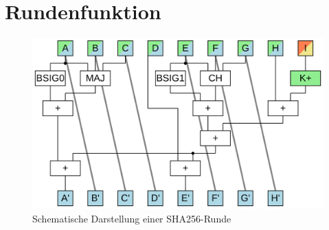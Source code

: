 \section{Rundenfunktion}


\begin{figure}[ht]
  \centering
  \includegraphics[scale=0.4]{images/sha256core}
  \caption{Schematische Darstellung einer SHA256-Runde}
  \label{fig:sha256core}
\end{figure}